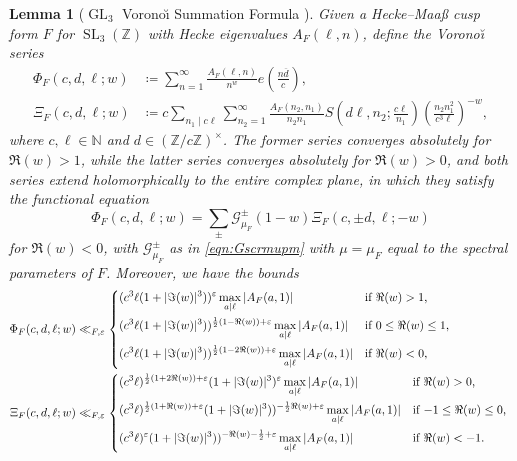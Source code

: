 \documentclass[11pt,a4paper]{amsart}
\newcommand{\e}{\varepsilon}
\newcommand{\Gscr}{\mathscr{G}}
\newcommand{\N}{\mathbb{N}}
\newcommand{\Z}{\mathbb{Z}}
\DeclareMathOperator{\GL}{GL}
\DeclareMathOperator{\SL}{SL}
\numberwithin{equation}{section}
\newtheorem{lemma}[equation]{Lemma}
\theoremstyle{remark}
\theoremstyle{definition}
\begin{document}
\begin{lemma}[{$\GL_3$ Vorono\u{\i} Summation Formula \cite[Section 4]{BK19}}]
Given a Hecke--Maa\ss{} cusp form $F$ for $\SL_3(\Z)$ with Hecke eigenvalues $A_F(\ell,n)$, define the Vorono\u{\i} series
\begin{align}
\label{eqn:PhiFdefeq}
\Phi_F(c,d,\ell;w) & \coloneqq \sum_{n = 1}^{\infty} \frac{A_F(\ell,n)}{n^w} e\left(\frac{n\overline{d}}{c}\right),	\\
\label{eqn:XiFdefeq}
\Xi_F(c,d,\ell;w) & \coloneqq c \sum_{n_1 \mid c\ell} \sum_{n_2 = 1}^{\infty} \frac{A_F(n_2,n_1)}{n_2 n_1} S\left(d\ell,n_2; \frac{c\ell}{n_1}\right) \left(\frac{n_2 n_1^2}{c^3 \ell}\right)^{-w},
\end{align}
where $c,\ell \in \N$ and $d \in (\Z/c\Z)^{\times}$. The former series converges absolutely for $\Re(w) > 1$, while the latter series converges absolutely for $\Re(w) > 0$, and both series extend holomorphically to the entire complex plane, in which they satisfy the functional equation
\begin{equation}
\label{eqn:GL3Voronoi}
\Phi_F(c,d,\ell;w) = \sum_{\pm} \Gscr_{\mu_F}^{\pm}(1 - w) \Xi_F(c,\pm d,\ell;-w)
\end{equation}
for $\Re(w) < 0$, with $\Gscr_{\mu_F}^{\pm}$ as in \eqref{eqn:Gscrmupm} with $\mu = \mu_F$ equal to the spectral parameters of $F$. Moreover, we have the bounds
\begin{align}
\label{eqn:PhiPL}
\Phi_F(c,d,\ell;w) & \ll_{F,\e} \begin{dcases*}
(c^3 \ell (1 + |\Im(w)|^3))^{\e} \max_{a \mid \ell} |A_F(a,1)| & if $\Re(w) > 1$,	\\
(c^3 \ell (1 + |\Im(w)|^3))^{\frac{1}{2}(1 - \Re(w)) + \e} \max_{a \mid \ell} |A_F(a,1)| & if $0 \leq \Re(w) \leq 1$,	\\
(c^3 \ell (1 + |\Im(w)|^3))^{\frac{1}{2}(1 - 2\Re(w)) + \e} \max_{a \mid \ell} |A_F(a,1)| & if $\Re(w) < 0$,
\end{dcases*}	\\
\label{eqn:XiFPL}
\Xi_F(c,d,\ell;w) & \ll_{F,\e} \begin{dcases*}
(c^3 \ell)^{\frac{1}{2}(1 + 2\Re(w)) + \e} (1 + |\Im(w)|^3)^{\e} \max_{a \mid \ell} |A_F(a,1)| & if $\Re(w) > 0$,	\\
(c^3 \ell)^{\frac{1}{2}(1 + \Re(w)) + \e} (1 + |\Im(w)|^3))^{-\frac{1}{2}\Re(w) + \e} \max_{a \mid \ell} |A_F(a,1)| & if $-1 \leq \Re(w) \leq 0$,	\\
(c^3 \ell)^{\e} (1 + |\Im(w)|^3))^{-\Re(w) - \frac{1}{2} + \e} \max_{a \mid \ell} |A_F(a,1)| & if $\Re(w) < -1$.
\end{dcases*}
\end{align}
\end{lemma}
\end{document}
